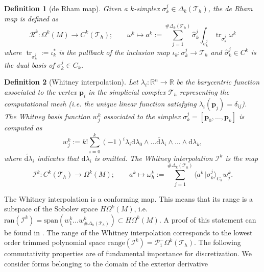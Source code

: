 \documentclass{elsarticle}
\newtheorem{definition}{Definition}
\renewcommand\d{\ensuremath{\mathrm{d}}}
\newcommand{\bbR}{\mathbb{R}}
\DeclareMathOperator{\tr}{tr}
\newcommand*{\dual}[1]{\ensuremath{\widehat{#1}}}
\newcommand{\dualpr}[3][]{\ensuremath{\langle #2 \, \vert #3 \rangle_{#1}}}
\begin{document}
\begin{definition}[de Rham map]
Given a $k$-simplex $\sigma_k^j \in \Delta_k(\mathcal{T}_h)$, the de Rham map is defined as
\begin{equation*}
    \mathcal{R}^k:
\Omega^k(M) \rightarrow C^k(\mathcal{T}_h) ; \qquad \omega^k \mapsto  a^k:=
\sum_{j=1}^{\# \Delta_k(\mathcal{T}_h)}
\dual{\sigma}_k^j
 \int_{\sigma_k^j} \tr_{\sigma_k^j} \omega^k
\end{equation*}
where $\tr_{\sigma_k^j}:=\iota_k^*$ is the pullback of the inclusion map $\iota_k: \sigma_k^j \rightarrow \mathcal{T}_h$
and $\dual{\sigma}_k^j \in C^k$ is the dual basis of $\sigma_k^j \in C_k$.
\end{definition}

\begin{definition}[Whitney interpolation]
Let $\lambda_i:\bbR^n \rightarrow \bbR$
be the barycentric function associated to the vertex $\mathbf{p}_i$ in the 
simplicial complex $\mathcal{T}_h$ representing the computational mesh
(i.e. the unique linear function satisfying $\lambda_i(\mathbf{p}_j) = \delta_{ij}$). \\
The Whitney basis function $w_j^k$ associated to the simplex $\sigma_k^j = [\mathbf{p}_0, \dots, \mathbf{p}_k]$ is computed as
\begin{equation}
    w^k_j := k! \sum_{i=0}^k (-1)^i \lambda_i \d\lambda_0 \wedge \dots \widetilde{\d\lambda}_i \wedge \dots \wedge \d\lambda_k,
\end{equation}
where $\widetilde{\d\lambda}_i$ indicates that $\d\lambda_i$ is omitted. The Whitney interpolation $\mathcal{I}^k$ is the map
\begin{equation*}
    \mathcal{I}^k:
  C^k(\mathcal{T}_h) \rightarrow \Omega^k(M) ; \qquad 
    a^k \mapsto \omega^k_h:= \sum_{j=1}^{\# \Delta_k(\mathcal{T}_h)}  \dualpr[C_k]{a^k}{\sigma_k^j} w^k_j.
\end{equation*}
\end{definition}
The Whitney interpolation is a conforming map. This means that its range is a subspace of the Sobolev space $H\Omega^k(M)$, i.e. $\text{ran}(\mathcal{I}^k)=\text{span}(w^k_1 \hdots w^k_{\#\Delta_k(\mathcal{T}_h)})
\subset H\Omega^k(M)$. A proof of this statement can be found in \cite[Theorem 4.4.]{gillette2011stability}. The range of the Whitney interpolation corresponds to the lowest order trimmed polynomial space $\text{range}(\mathcal{I}^k) = \mathcal{P}^{-}_1\Omega^k(\mathcal{T}_h)$. The following commutativity properties are of fundamental importance for discretization. We consider forms belonging to the domain of the exterior derivative 
\end{document}
